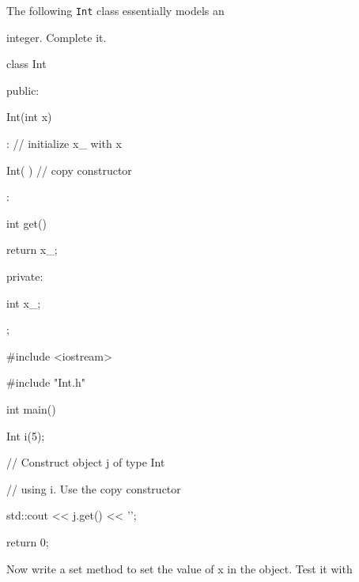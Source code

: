 The following \texttt{Int} class essentially models an

integer. Complete it.



\begin{consolethree}[escapeinside=||]

class Int

{

public:

    Int(int x)

        :              // initialize x_ with x

    {}



    Int(           ) // copy constructor

        :

    {}



    int get()

    {

        return x_;

    }



private:

    int x_;

};

\end{consolethree}



\begin{consolethree}[escapeinside=||]

#include <iostream>

#include "Int.h"



int main()

{

    Int i(5);



    // Construct object j of type Int

    // using i. Use the copy constructor



    std::cout << j.get() << '\n';



    return 0;

}

\end{consolethree}



Now write a set method to set the value of x in the object. Test it with

